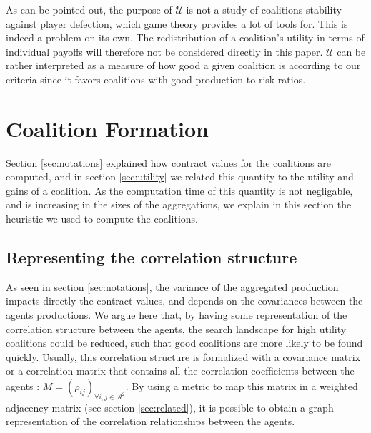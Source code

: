 \documentclass[conference]{IEEEtran}
\begin{document}

As can be pointed out, the purpose of $ \mathcal{U} $ is not a study of coalitions stability against player defection, which game theory provides a lot of tools for. This is indeed a problem on its own. The redistribution of a coalition's utility in terms of individual payoffs will therefore not be considered directly in this paper. $ \mathcal{U} $ can be rather interpreted as a measure of how good a given coalition is according to our criteria since it favors coalitions with good production to risk ratios.





%
%
\section{Coalition Formation}
\label{sec:forming}
Section \ref{sec:notations} explained how contract values for the coalitions are computed, and in section \ref{sec:utility} we related this quantity to the utility and gains of a coalition. As the computation time of this quantity is not negligable, and is increasing in the sizes of the aggregations, we explain in this section the heuristic we used to compute the coalitions. 

\subsection{Representing the correlation structure}
As seen in section \ref{sec:notations}, the variance of the aggregated production impacts directly the contract values, and depends on the covariances between the agents productions. We argue here that, by having some representation of the correlation structure between the agents, the search landscape for high utility coalitions could be reduced, such that good coalitions are more likely to be found quickly. Usually, this correlation structure is formalized with a covariance matrix or a correlation matrix that contains all the correlation coefficients between the agents : $ M = (\rho_{ij})_{\forall i,j \in \mathcal{A}^{2}}$. By using a metric to map this matrix in a weighted adjacency matrix (see section \ref{sec:related}), it is possible to obtain a graph representation of the correlation relationships between the agents. 
\end{document}
